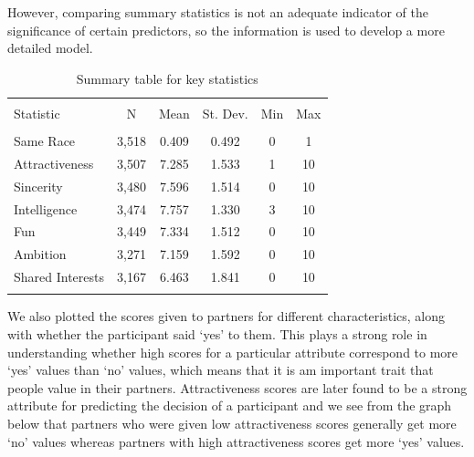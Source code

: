 \documentclass{article}
\begin{document}
However, comparing summary statistics is not an adequate indicator of the significance of certain predictors, so the information is used to develop a more detailed model. \\
\begin{table}[!htbp] \centering 
  \caption{Summary table for key statistics} 
  \label{fig:sum_table} 
\begin{tabular}{@{\extracolsep{5pt}}lccccc} 
\\[-1.8ex]\hline 
\hline \\[-1.8ex] 
Statistic & \multicolumn{1}{c}{N} & \multicolumn{1}{c}{Mean} & \multicolumn{1}{c}{St. Dev.} & \multicolumn{1}{c}{Min} & \multicolumn{1}{c}{Max} \\ 
\hline \\[-1.8ex] 
Same Race & 3,518 & 0.409 & 0.492 & 0 & 1 \\ 
Attractiveness & 3,507 & 7.285 & 1.533 & 1 & 10 \\ 
Sincerity & 3,480 & 7.596 & 1.514 & 0 & 10 \\ 
Intelligence & 3,474 & 7.757 & 1.330 & 3 & 10 \\ 
Fun & 3,449 & 7.334 & 1.512 & 0 & 10 \\ 
Ambition & 3,271 & 7.159 & 1.592 & 0 & 10 \\ 
Shared Interests & 3,167 & 6.463 & 1.841 & 0 & 10 \\ 
\hline \\[-1.8ex] 
\end{tabular} 
\end{table} 
%
We also plotted the scores given to partners for different characteristics, along with whether the participant said `yes' to them. This plays a strong role in understanding whether high scores for a particular attribute correspond to more `yes' values than `no' values, which means that it is am important trait that people value in their partners. Attractiveness scores are later found to be a strong attribute for predicting the decision of a participant and we see from the graph below that partners who were given low attractiveness scores generally get more `no' values whereas partners with high attractiveness scores get more `yes' values.\\
\end{document}
